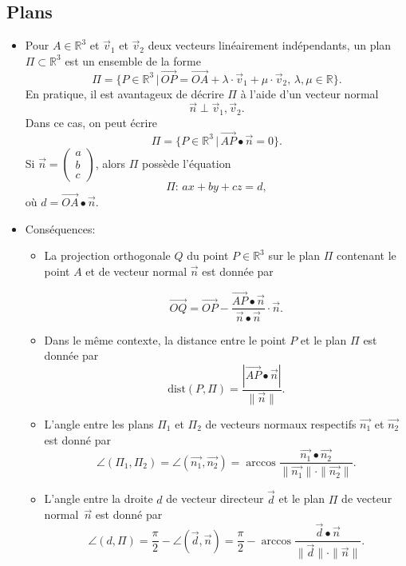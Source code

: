 \documentclass[12pt,a4paper]{article}
\newcommand{\vect}{\overrightarrow}
\begin{document}
\subsection{Plans}
\begin{itemize}[label=$\bullet$]
\item Pour $A\in\mathbb{R}^3$ et $\vect{v}_1$ et $\vect{v}_2$ deux vecteurs linéairement indépendants, un \colorbox{def!40}{plan} $\Pi\subset\mathbb{R}^3$ est un ensemble de la forme
\[\Pi=\{P\in\mathbb{R}^3\,|\,\vect{OP}=\vect{OA}+\lambda\cdot\vect{v}_1+\mu\cdot\vect{v}_2,\,\lambda,\mu\in\mathbb{R}\}.\]
En pratique, il est avantageux de décrire $\Pi$ à l'aide d'un \colorbox{def!40}{vecteur normal} $$\vect{n}\perp \vect{v}_1,\vect{v}_2.$$ Dans ce cas, on peut écrire
\[\Pi=\{P\in\mathbb{R}^3\,|\,\vect{AP}\bullet\vect{n}=0\}.\]
Si $\vect{n}=\begin{pmatrix}
a\\b\\c
\end{pmatrix}$, alors $\Pi$ possède l'équation
\[\Pi:\,ax+by+cz=d,\]
où $d=\vect{OA}\bullet\vect{n}$.
\item \textcolor{th!60!black}{Conséquences:}
\begin{itemize}[label=$\circ$]
\item La \colorbox{def!40}{projection orthogonale} $Q$ \colorbox{def!40}{du point} $P\in\mathbb{R}^3$ \colorbox{def!40}{sur le plan} $\Pi$ contenant le point $A$ et de vecteur normal $\vect{n}$ est donnée par

$$\displaystyle \vect{OQ}=\vect{OP}-\frac{\vect{AP}\bullet\vect{n}}{\vect{n}\bullet\vect{n}}\cdot \vect{n}.$$

\item Dans le même contexte, la \colorbox{def!40}{distance entre le point} $P$ \colorbox{def!40}{et le plan} $\Pi$ est donnée par $$\mathrm{dist}(P,\Pi)=\displaystyle \frac{|\vect{AP}\bullet\vect{n}|}{\|\vect{n}\|}.$$

\item L'\colorbox{def!40}{angle entre les plans} $\Pi_1$ et $\Pi_2$ de vecteurs normaux respectifs $\vect{n_1}$ et $\vect{n_2}$ est donné par $$\displaystyle \angle(\Pi_1,\Pi_2)=\angle(\vect{n_1},\vect{n_2})=\arccos\frac{\vect{n_1}\bullet\vect{n_2}}{\|\vect{n_1}\|\cdot\|\vect{n_2}\|}.$$

\item L'\colorbox{def!40}{angle entre la droite} $d$ de vecteur directeur $\vect{d}$ \colorbox{def!40}{et le plan} $\Pi$ de vecteur normal~$\vect{n}$ est donné par $$\displaystyle\angle(d,\Pi)=\frac{\pi}{2}-\angle(\vect{d},\vect{n})=\frac{\pi}{2}-\arccos\frac{\vect{d}\bullet\vect{n}}{\|\vect{d}\|\cdot\|\vect{n}\|}.$$


\end{itemize}
\end{itemize}
\end{document}
